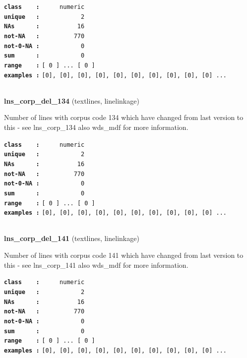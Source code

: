 \documentclass[]{article}
\begin{document}
\textbf{\texttt{class\ \ \ \ :}} \texttt{~~~~~numeric}\\
\textbf{\texttt{unique\ \ \ :}} \texttt{~~~~~~~~~~~2}\\
\textbf{\texttt{NAs\ \ \ \ \ \ :}} \texttt{~~~~~~~~~~16}\\
\textbf{\texttt{not-NA\ \ \ :}} \texttt{~~~~~~~~~770}\\
\textbf{\texttt{not-0-NA\ :}} \texttt{~~~~~~~~~~~0}\\
\textbf{\texttt{sum\ \ \ \ \ \ :}} \texttt{~~~~~~~~~~~0}\\
\textbf{\texttt{range\ \ \ \ :}}
\texttt{{[}\ 0\ {]}\ ...\ {[}\ 0\ {]}}\\
\textbf{\texttt{examples\ :}}
\texttt{{[}0{]},\ {[}0{]},\ {[}0{]},\ {[}0{]},\ {[}0{]},\ {[}0{]},\ {[}0{]},\ {[}0{]},\ {[}0{]},\ {[}0{]}\ ...}\\

~

\textbf{lns\_corp\_del\_134} (textlines, linelinkage)

Number of lines with corpus code 134 which have changed from last
version to this - see lns\_corp\_134 also wds\_mdf for more information.

\textbf{\texttt{class\ \ \ \ :}} \texttt{~~~~~numeric}\\
\textbf{\texttt{unique\ \ \ :}} \texttt{~~~~~~~~~~~2}\\
\textbf{\texttt{NAs\ \ \ \ \ \ :}} \texttt{~~~~~~~~~~16}\\
\textbf{\texttt{not-NA\ \ \ :}} \texttt{~~~~~~~~~770}\\
\textbf{\texttt{not-0-NA\ :}} \texttt{~~~~~~~~~~~0}\\
\textbf{\texttt{sum\ \ \ \ \ \ :}} \texttt{~~~~~~~~~~~0}\\
\textbf{\texttt{range\ \ \ \ :}}
\texttt{{[}\ 0\ {]}\ ...\ {[}\ 0\ {]}}\\
\textbf{\texttt{examples\ :}}
\texttt{{[}0{]},\ {[}0{]},\ {[}0{]},\ {[}0{]},\ {[}0{]},\ {[}0{]},\ {[}0{]},\ {[}0{]},\ {[}0{]},\ {[}0{]}\ ...}\\

~

\textbf{lns\_corp\_del\_141} (textlines, linelinkage)

Number of lines with corpus code 141 which have changed from last
version to this - see lns\_corp\_141 also wds\_mdf for more information.

\textbf{\texttt{class\ \ \ \ :}} \texttt{~~~~~numeric}\\
\textbf{\texttt{unique\ \ \ :}} \texttt{~~~~~~~~~~~2}\\
\textbf{\texttt{NAs\ \ \ \ \ \ :}} \texttt{~~~~~~~~~~16}\\
\textbf{\texttt{not-NA\ \ \ :}} \texttt{~~~~~~~~~770}\\
\textbf{\texttt{not-0-NA\ :}} \texttt{~~~~~~~~~~~0}\\
\textbf{\texttt{sum\ \ \ \ \ \ :}} \texttt{~~~~~~~~~~~0}\\
\textbf{\texttt{range\ \ \ \ :}}
\texttt{{[}\ 0\ {]}\ ...\ {[}\ 0\ {]}}\\
\textbf{\texttt{examples\ :}}
\texttt{{[}0{]},\ {[}0{]},\ {[}0{]},\ {[}0{]},\ {[}0{]},\ {[}0{]},\ {[}0{]},\ {[}0{]},\ {[}0{]},\ {[}0{]}\ ...}\\
\end{document}
